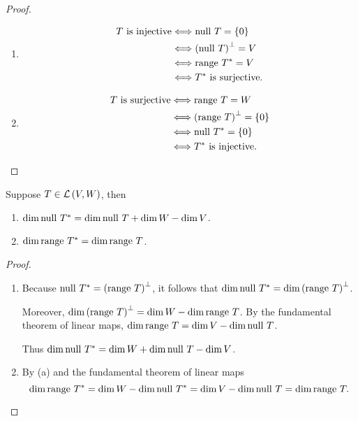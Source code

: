 \begin{proof}
    \begin{enumerate}[label={(\alph*)}]
        \item \begin{align*}
                  \text{$T$ is injective} & \Longleftrightarrow \operatorname{null}\,{T} = \{0\}            \\
                                          & \Longleftrightarrow {(\operatorname{null}\,{T})}^{\bot} = V     \\
                                          & \Longleftrightarrow \operatorname{range}\,{T^{*}} = V             \\
                                          & \Longleftrightarrow \text{$T^{*}$ is surjective}.
              \end{align*}
        \item \begin{align*}
                  \text{$T$ is surjective} & \Longleftrightarrow \operatorname{range}\,{T} = W                \\
                                           & \Longleftrightarrow {(\operatorname{range}\,{T})}^{\bot} = \{0\} \\
                                           & \Longleftrightarrow \operatorname{null}\,{T^{*}} = \{0\}       \\
                                           & \Longleftrightarrow \text{$T^{*}$ is injective}.
              \end{align*}
    \end{enumerate}
\end{proof}
\newpage

\begin{exercise}\label{chapter7:sectionA:exercise7}
    Suppose $T\in\mathcal{L}\left({V, W}\right)$, then
    \begin{enumerate}[label={(\alph*)}]
        \item $\dim \operatorname{null}\,{T^{*}} = \dim \operatorname{null}\,{T} + \dim W - \dim V$.
        \item $\dim \operatorname{range}\,{T^{*}} = \dim \operatorname{range}\,{T}$.
    \end{enumerate}
\end{exercise}

\begin{proof}
    \begin{enumerate}[label={(\alph*)}]
        \item Because $\operatorname{null}\,{T^{*}} = {(\operatorname{range}\,{T})}^{\bot}$, it follows that $\dim \operatorname{null}\,{T^{*}} = \dim {(\operatorname{range}\,{T})}^{\bot}$.

              Moreover, $\dim {(\operatorname{range}\,{T})}^{\bot} = \dim W - \dim \operatorname{range}\,{T}$. By the fundamental theorem of linear maps, $\dim\operatorname{range}\,{T} = \dim V - \dim\operatorname{null}\,{T}$.

              Thus $\dim\operatorname{null}\,{T^{*}} = \dim W + \dim\operatorname{null}\,{T} - \dim V$.
        \item By (a) and the fundamental theorem of linear maps
              \[
                  \dim\operatorname{range}\,{T^{*}} = \dim W - \dim\operatorname{null}\,{T^{*}} = \dim V - \dim\operatorname{null}\,{T} = \dim\operatorname{range}\,{T}.
              \]
    \end{enumerate}
\end{proof}
\newpage

